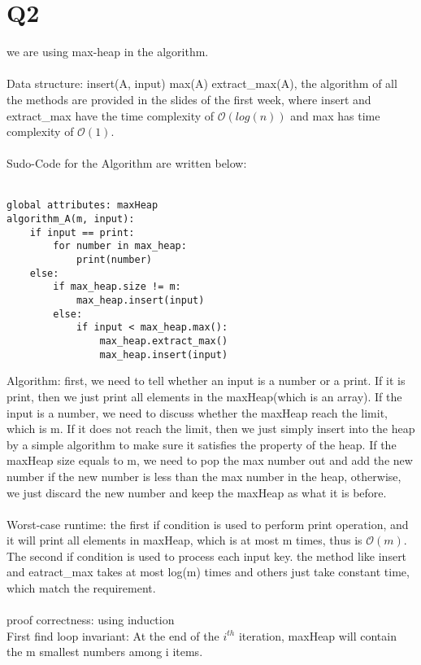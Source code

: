 \documentclass[11pt]{article}
\begin{document}
\section*{Q2}
we are using max-heap in the algorithm.\\
\\
Data structure: insert(A, input) max(A) extract\_max(A), the algorithm of all the methods are provided in the slides of the first week, where insert and extract\_max have the time complexity of $\mathcal{O}(log(n))$ and max has time complexity of $\mathcal{O}(1)$.\\
\\
Sudo-Code for the Algorithm are written below:\\
\\
\begin{lstlisting}[frame=single]
global attributes: maxHeap
algorithm_A(m, input):
	if input == print:
		for number in max_heap:
			print(number)
	else:
		if max_heap.size != m:
			max_heap.insert(input)
		else:
			if input < max_heap.max():
				max_heap.extract_max()
				max_heap.insert(input)
\end{lstlisting}
Algorithm: first, we need to tell whether an input is a number or a print. If it is print, then we just print all elements in the maxHeap(which is an array). If the input is a number, we need to discuss whether the maxHeap reach the limit, which is m. If it does not reach the limit, then we just simply insert into the heap by a simple algorithm to make sure it satisfies the property of the heap. If the maxHeap size equals to m, we need to pop the max number out and add the new number if the new number is less than the max number in the heap, otherwise, we just discard the new number and keep the maxHeap as what it is before.\\
\\
Worst-case runtime: the first if condition is used to perform print operation, and it will print all elements in maxHeap, which is at most m times, thus is $\mathcal{O}(m)$. The second if condition is used to process each input key. the method like insert and eatract\_max takes at most log(m) times and others just take constant time, which match the requirement.\\
\\
proof correctness: using induction\\
First find loop invariant: At the end of the $i^{th}$ iteration, maxHeap will contain the m smallest numbers among i items.
\end{document}
